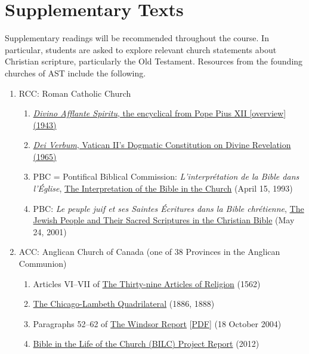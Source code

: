\documentclass[titlepage]{article}
\begin{document}
\section{Supplementary Texts}
\label{supplementary}

Supplementary readings will be recommended throughout the course. In
particular, students are asked to explore relevant church statements
about Christian scripture, particularly the Old Testament. Resources
from the founding churches of AST include the following.

\begin{enumerate}

\item RCC: Roman Catholic Church

	\begin{enumerate}
	\item \href{}{\emph{Divino Afflante Spiritu}, the encyclical from Pope Pius XII [\href{http://www.bc.edu/schools/stm/crossroads/resources/deathofjesus/intro/the_catholic_approachtothebible.html}{overview}] (1943)}
	\item \href{}{\emph{Dei Verbum}, Vatican II's Dogmatic Constitution on Divine Revelation (1965)}
	\item PBC = Pontifical Biblical Commission: \emph{L'interprétation de la Bible dans l'Église}, \href{http://www.catholic-resources.org/ChurchDocs/PBC_Interp.htm}{The Interpretation of the Bible in the Church} (April 15, 1993)
	\item PBC: \emph{Le peuple juif et ses Saintes Écritures dans la Bible chrétienne}, \href{http://www.vatican.va/roman_curia/congregations/cfaith/pcb_documents/rc_con_cfaith_doc_20020212_popolo-ebraico_en.html}{The Jewish People and Their Sacred Scriptures in the Christian Bible} (May 24, 2001)
	\end{enumerate}

\item ACC: Anglican Church of Canada (one of 38 Provinces in the Anglican Communion)

	\begin{enumerate}
	\item Articles VI–VII of \href{https://www.churchofengland.org/prayer-worship/worship/book-of-common-prayer/articles-of-religion.aspx}{The Thirty-nine Articles of Religion} (1562)
	\item \href{http://anglicansonline.org/basics/Chicago_Lambeth.html}{The Chicago-Lambeth Quadrilateral} (1886, 1888)
	\item Paragraphs 52–62 of \href{http://www.anglicancommunion.org/resources/document-library.aspx?author=The+Windsor+Process&language=English}{The Windsor Report} [\href{http://www.anglicancommunion.org/media/68225/windsor2004full.pdf}{PDF}] (18 October 2004)
	\item \href{http://www.anglicancommunion.org/media/98131/Final-Report-for-the-web.pdf}{Bible in the Life of the Church (BILC) Project Report} (2012)
	\end{enumerate}


\end{enumerate}
\end{document}
